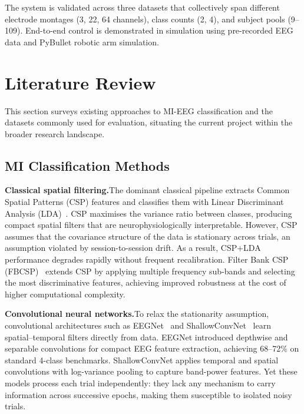 \documentclass[12pt, a4paper]{article}
\begin{document}
The system is validated across three datasets that collectively span different electrode montages (3, 22, 64 channels), class counts (2, 4), and subject pools (9--109). End-to-end control is demonstrated in simulation using pre-recorded EEG data and PyBullet robotic arm simulation.

\section{Literature Review}

This section surveys existing approaches to MI-EEG classification and the datasets commonly used for evaluation, situating the current project within the broader research landscape.

\subsection{MI Classification Methods}

\textbf{Classical spatial filtering.}\quad The dominant classical pipeline extracts Common Spatial Patterns (CSP) features and classifies them with Linear Discriminant Analysis (LDA)~\cite{hameed2025enhancing}. CSP maximises the variance ratio between classes, producing compact spatial filters that are neurophysiologically interpretable. However, CSP assumes that the covariance structure of the data is stationary across trials, an assumption violated by session-to-session drift. As a result, CSP+LDA performance degrades rapidly without frequent recalibration. Filter Bank CSP (FBCSP)~\cite{ang2008fbcsp} extends CSP by applying multiple frequency sub-bands and selecting the most discriminative features, achieving improved robustness at the cost of higher computational complexity.

\textbf{Convolutional neural networks.}\quad To relax the stationarity assumption, convolutional architectures such as EEGNet~\cite{lawhern2018eegnet} and ShallowConvNet~\cite{schirrmeister2017deep} learn spatial--temporal filters directly from data. EEGNet introduced depthwise and separable convolutions for compact EEG feature extraction, achieving 68--72\% on standard 4-class benchmarks. ShallowConvNet applies temporal and spatial convolutions with log-variance pooling to capture band-power features. Yet these models process each trial independently: they lack any mechanism to carry information across successive epochs, making them susceptible to isolated noisy trials.
\end{document}
